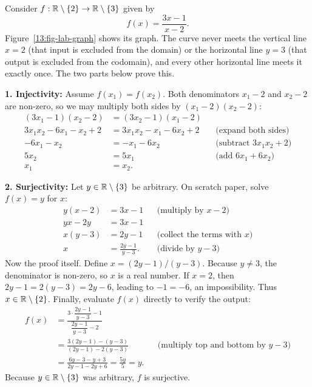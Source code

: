 \begin{labbox}
Consider $f: \mathbb{R} \setminus \{2\} \to \mathbb{R} \setminus \{3\}$ given by
\[
f(x) = \frac{3x - 1}{x - 2}.
\]
Figure~\ref{13:fig-lab-graph} shows its graph. The curve never meets the vertical line $x = 2$ (that input is excluded from the domain) or the horizontal line $y = 3$ (that output is excluded from the codomain), and every other horizontal line meets it exactly once. The two parts below prove this.

\textbf{1. Injectivity:} Assume $f(x_1) = f(x_2)$. Both denominators $x_1 - 2$ and $x_2 - 2$ are non-zero, so we may multiply both sides by $(x_1 - 2)(x_2 - 2)$:
\begin{align*}
(3x_1 - 1)(x_2 - 2) &= (3x_2 - 1)(x_1 - 2) \\
3x_1 x_2 - 6x_1 - x_2 + 2 &= 3x_1 x_2 - x_1 - 6x_2 + 2 && \text{(expand both sides)} \\
-6x_1 - x_2 &= -x_1 - 6x_2 && \text{(subtract $3x_1x_2 + 2$)} \\
5x_2 &= 5x_1 && \text{(add $6x_1 + 6x_2$)} \\
x_1 &= x_2.
\end{align*}

\textbf{2. Surjectivity:} Let $y \in \mathbb{R} \setminus \{3\}$ be arbitrary. On scratch paper, solve $f(x) = y$ for $x$:
\begin{align*}
y(x - 2) &= 3x - 1 && \text{(multiply by $x - 2$)} \\
yx - 2y &= 3x - 1 \\
x(y - 3) &= 2y - 1 && \text{(collect the terms with $x$)} \\
x &= \frac{2y - 1}{y - 3}. && \text{(divide by $y - 3$)}
\end{align*}
Now the proof itself. Define $x = (2y - 1)/(y - 3)$. Because $y \neq 3$, the denominator is non-zero, so $x$ is a real number. If $x = 2$, then $2y - 1 = 2(y - 3) = 2y - 6$, leading to $-1 = -6$, an impossibility. Thus $x \in \mathbb{R} \setminus \{2\}$. Finally, evaluate $f(x)$ directly to verify the output:
\begin{align*}
f(x) &= \frac{3 \cdot \dfrac{2y - 1}{y - 3} - 1}{\dfrac{2y - 1}{y - 3} - 2} \\[4pt]
&= \frac{3(2y - 1) - (y - 3)}{(2y - 1) - 2(y - 3)} && \text{(multiply top and bottom by $y - 3$)} \\[4pt]
&= \frac{6y - 3 - y + 3}{2y - 1 - 2y + 6} = \frac{5y}{5} = y.
\end{align*}
Because $y \in \mathbb{R} \setminus \{3\}$ was arbitrary, $f$ is surjective.
\end{labbox}

